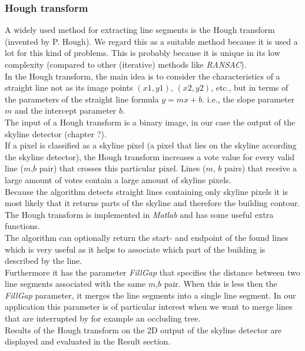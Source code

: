 \documentclass[10pt]{article}
\begin{document}
\subsubsection{Hough transform}
	A widely used method for extracting line segments is the Hough transform
	(invented by P. Hough).  We regard this as a suitable method because it is
	used a lot for this kind of problems. This is probably because it is unique
	in its low complexity (compared to other (iterative) methods like
	\emph{RANSAC}).\\
	In the Hough transform, the main idea is to consider the characteristics of a
	straight line not as its image points $(x1, y1)$, $(x2, y2)$, etc., but in
	terms of the parameters of the straight line formula $y = mx + b$. i.e., the
	slope parameter $m$ and the intercept parameter $b$.\\
	The input of a Hough transform is a binary image, in our case the output of 
	the skyline detector (chapter ?).\\
	If a pixel is classified as a skyline pixel (a pixel that lies on the
	skyline according the skyline detector), the Hough transform increases
	a vote value for every valid line ($m$,$b$ pair) that crosses this
	particular pixel.  Lines ($m$, $b$ pairs) that receive a large amount of votes
	contain a large amount of skyline pixels.\\
	Because the algorithm detects straight lines containing only skyline pixels it is
	most likely that it returns parts of the skyline and therefore the building contour. \\
	The Hough transform is implemented in \emph{Matlab} and has some useful extra functions.\\
	The algorithm can optionally return the start- and endpoint of the found lines 
	which is very useful as it helps to associate which part of the building is
	described by the line.\\
	Furthermore it has the parameter \emph{FillGap} that specifies the distance
	between two line segments associated with the same $m$,$b$ pair.  When this
	is less then the \emph{FillGap} parameter, it merges the line segments into
	a single line segment. In our application this parameter is of particular
	interest when we want to merge lines that are interrupted by for example an
	occluding tree.\\
	Results of the Hough transform on the 2D output of the skyline detector are
	displayed and evaluated in the Result section.
\end{document}
